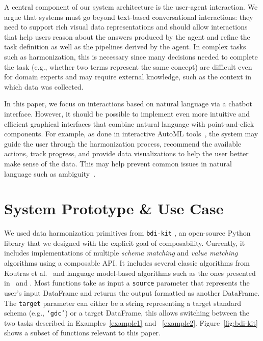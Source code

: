 A central component of our system architecture is the user-agent interaction. We argue that systems must go beyond text-based conversational interactions: they need to support rich visual data representations and should allow interactions that help users reason about the answers produced by the agent and refine the task definition as well as the pipelines derived by the agent. In complex tasks such as harmonization, this is necessary since many decisions needed to complete the task (e.g., whether two terms represent the same concept) are difficult even for domain experts and may require external knowledge, such as the context in which data was collected.

In this paper, we focus on interactions based on natural language via a chatbot interface. However, it should be possible to implement even more intuitive and efficient graphical interfaces that combine natural language with point-and-click components. For example, as done in interactive AutoML tools~\cite{santos2019visus}, the system may guide the user through the harmonization process, recommend the available actions, track progress, and provide data visualizations to help the user better make sense of the data. This may help prevent common issues in natural language such as ambiguity~\cite{esfandiarpoor2024followup}.

\vspace{-.75em}
\section{System Prototype \& Use Case} \label{sec:prototype}

We used data harmonization primitives from \texttt{bdi-kit} \cite{bdi-kit-github}, an open-source Python library that we designed with the explicit goal of composability.
Currently, it includes implementations of multiple \textit{schema matching} and \textit{value matching} algorithms using a composable API. It includes several classic algorithms from Koutras et al.~\cite{koutras2021valentine} and language model-based algorithms such as the ones presented in~\cite{liu2024enhancing} and \cite{liu2024magneto}. Most functions take as input a \texttt{source} parameter that represents the user's input DataFrame and returns the output formatted as another DataFrame. The \texttt{target} parameter can either be a string representing a target standard schema (e.g., \texttt{`gdc'}) or a target DataFrame, this allows switching between the two tasks described in Examples~\ref{example1} and ~\ref{example2}. Figure~\ref{fig:bdi-kit} shows a subset of functions relevant to this paper.

